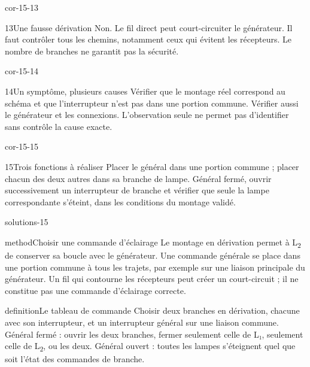 \documentclass[12pt,twoside,openany]{book}
\begin{document}
\begin{blocLivre}{cor-15-13}
\begin{corrige}{13}{Une fausse dérivation}
Non. Le fil direct peut court-circuiter le générateur. Il faut contrôler tous les chemins, notamment ceux qui évitent les récepteurs. Le nombre de branches ne garantit pas la sécurité.\par
{}
\end{corrige}\end{blocLivre}
\begin{blocLivre}{cor-15-14}
\begin{corrige}{14}{Un symptôme, plusieurs causes}
Vérifier que le montage réel correspond au schéma et que l’interrupteur n’est pas dans une portion commune. Vérifier aussi le générateur et les connexions. L’observation seule ne permet pas d’identifier sans contrôle la cause exacte.\par
\end{corrige}\end{blocLivre}
\begin{blocLivre}{cor-15-15}
\begin{corrige}{15}{Trois fonctions à réaliser}
Placer le général dans une portion commune ; placer chacun des deux autres dans sa branche de lampe. Général fermé, ouvrir successivement un interrupteur de branche et vérifier que seule la lampe correspondante s’éteint, dans les conditions du montage validé.\par
\end{corrige}\end{blocLivre}
\label{solutions-15}
\begin{pcFiche}{solutions-15}
\begin{pcEncadre}{method}{Choisir une commande d’éclairage}
Le montage en dérivation permet à L\textsubscript{2} de conserver sa boucle avec le générateur. Une commande générale se place dans une portion commune à tous les trajets, par exemple sur une liaison principale du générateur. Un fil qui contourne les récepteurs peut créer un court-circuit ; il ne constitue pas une commande d’éclairage correcte.\par
\end{pcEncadre}
\label{defi-cor-15}
\begin{pcEncadre}{definition}{Le tableau de commande}
Choisir deux branches en dérivation, chacune avec son interrupteur, et un interrupteur général sur une liaison commune. Général fermé : ouvrir les deux branches, fermer seulement celle de L₁, seulement celle de L\textsubscript{2}, ou les deux. Général ouvert : toutes les lampes s’éteignent quel que soit l’état des commandes de branche.\par
\end{pcEncadre}
\end{pcFiche}
\end{document}
